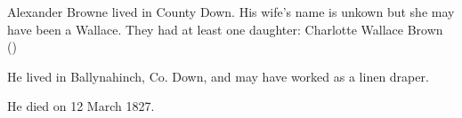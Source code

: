 
Alexander Browne lived in County Down. His wife's name is unkown but she may have been a Wallace. They had at least one daughter: Charlotte Wallace Brown ()

He lived in Ballynahinch, Co. Down, and may have worked as a linen draper.

He died on 12 March 1827. 	

